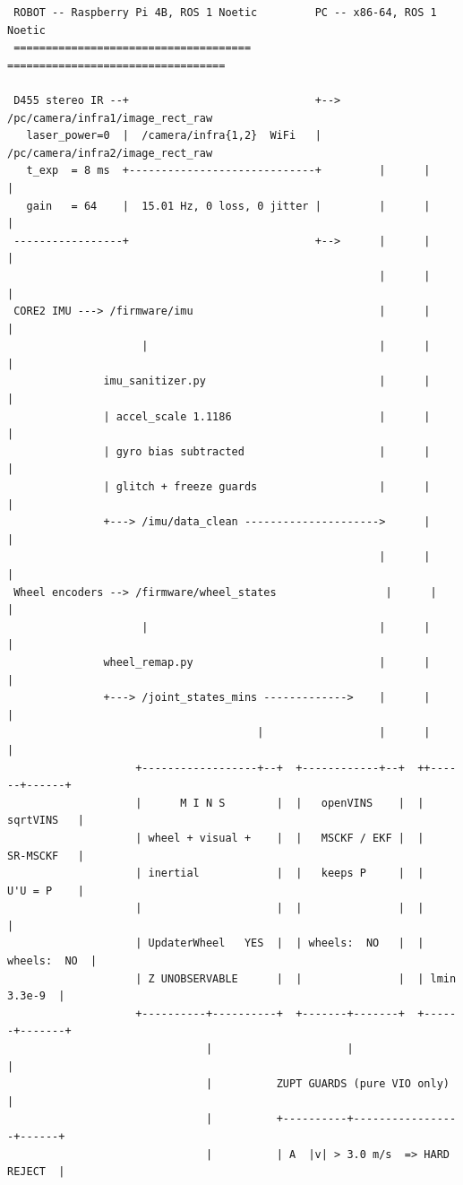 \begin{verbatim}
 ROBOT -- Raspberry Pi 4B, ROS 1 Noetic         PC -- x86-64, ROS 1 Noetic
 =====================================         ==================================

 D455 stereo IR --+                             +--> /pc/camera/infra1/image_rect_raw
   laser_power=0  |  /camera/infra{1,2}  WiFi   |    /pc/camera/infra2/image_rect_raw
   t_exp  = 8 ms  +-----------------------------+         |      |      |
   gain   = 64    |  15.01 Hz, 0 loss, 0 jitter |         |      |      |
 -----------------+                             +-->      |      |      |
                                                          |      |      |
 CORE2 IMU ---> /firmware/imu                             |      |      |
                     |                                    |      |      |
               imu_sanitizer.py                           |      |      |
               | accel_scale 1.1186                       |      |      |
               | gyro bias subtracted                     |      |      |
               | glitch + freeze guards                   |      |      |
               +---> /imu/data_clean --------------------->      |      |
                                                          |      |      |
 Wheel encoders --> /firmware/wheel_states                 |      |      |
                     |                                    |      |      |
               wheel_remap.py                             |      |      |
               +---> /joint_states_mins ------------->    |      |      |
                                       |                  |      |      |
                    +------------------+--+  +------------+--+  ++------+------+
                    |      M I N S        |  |   openVINS    |  |   sqrtVINS   |
                    | wheel + visual +    |  |   MSCKF / EKF |  |   SR-MSCKF   |
                    | inertial            |  |   keeps P     |  |   U'U = P    |
                    |                     |  |               |  |              |
                    | UpdaterWheel   YES  |  | wheels:  NO   |  | wheels:  NO  |
                    | Z UNOBSERVABLE      |  |               |  | lmin 3.3e-9  |
                    +----------+----------+  +-------+-------+  +------+-------+
                               |                     |                 |
                               |          ZUPT GUARDS (pure VIO only)  |
                               |          +----------+-----------------+------+
                               |          | A  |v| > 3.0 m/s  => HARD REJECT  |

\end{verbatim}

